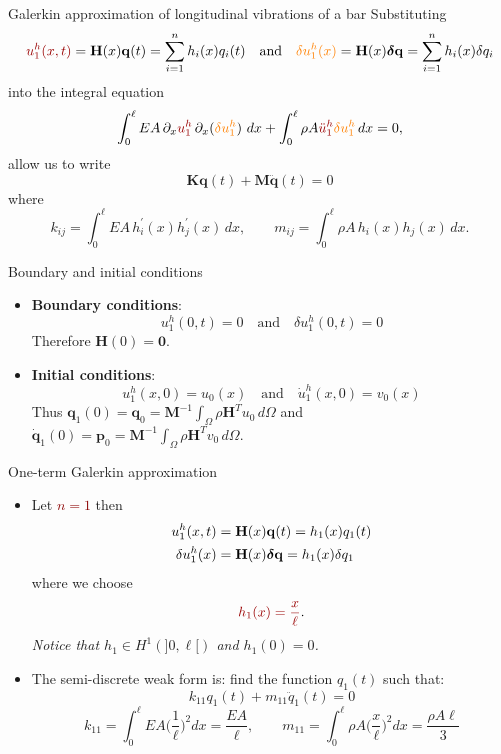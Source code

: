 \documentclass[aspectratio=169]{beamer}
\begin{document}
\begin{frame}{Galerkin approximation of longitudinal vibrations of a bar}
  Substituting
  $${\color{darkred} u_{1}^{h}(x,t)}=\mathbf H(x)\mathbf q(t)=\sum_{i=1}^nh_i(x)q_{i}(t)\quad\mbox{and}\quad {\color{orange}\delta u_{1}^{h}(x)}=\mathbf H(x)\bolddelta\mathbf q=\sum_{i=1}^nh_i(x)\delta q_{i}$$
  into the integral equation
  \[
    \int_0^\ell EA\, \partial_{x} {\color{darkred} u_1^h}\,\partial_{x}({\color{orange} \delta u_1^h})\ dx +\int_0^\ell\rho A {\color{darkred} \ddot{u}_1^h}{\color{orange} \delta u_1^h}\, dx=0,
  \]
  allow us to write
  \[
    \mathbf K\mathbf q(t)+\mathbf M\mathbf{\ddot q}(t)=0
  \]
  where
  \[
    k_{ij}  =\int_0^\ell EA\, h_i^\prime(x)h_j^\prime(x)\, dx, \qquad
    m_{ij}  =\int_0^\ell\rho A\, h_i(x)h_j(x)\, dx.
  \]
\end{frame}

\begin{frame}{Boundary and initial conditions}
  \begin{itemize}
    \item\textbf{Boundary conditions}:
          $$u_{1}^{h}(0,t)=0\quad\mbox{and}\quad \delta u_{1}^{h}(0,t)=0$$
          Therefore $\mathbf H(0)=\mathbf 0$.
          \vspace{0.5cm}\pause
    \item  \textbf{Initial conditions}:
          $$u_{1}^{h}(x,0)= u_{0}(x)\quad\mbox{and}\quad \dot u_{1}^{h}(x,0)= v_{0}(x)$$
          Thus $\mathbf q_{1}(0)=\mathbf q_{0}=\mathbf M^{-1}\int_\Omega \rho \mathbf H^T{u}_0\, d\Omega$ and $\mathbf{\dot q}_{1}(0)=\mathbf p_{0}=\mathbf M^{-1}\int_\Omega \rho \mathbf H^T{v}_0\, d\Omega$.
  \end{itemize}
\end{frame}

\begin{frame}{One-term Galerkin approximation}
  \begin{itemize}
    \item Let \textcolor{darkred}{$n=1$} then
          \begin{align*}
            u_{1}^{h}(x,t)      & =\mathbf H(x)\mathbf q(t)=h_{1}(x)q_{1}(t)            \\
            \delta u_{1}^{h}(x) & =\mathbf H(x)\boldsymbol\delta\mathbf q=h_{1}(x)\delta q_{1}
          \end{align*}
          where we choose
          $${\color{darkred} h_{1}(x)=\frac{x}{\ell}}.$$
          \emph{Notice that $h_{1}\in H^{1}(]0,\ell[)$ and $h_{1}(0)=0$.}
    \item The semi-discrete weak form is: find the function $q_{1}(t)$ such that:
          $$k_{11}q_{1}(t)+m_{11}\ddot q_{1}(t)=0$$
          $$k_{11}=\int_{0}^{\ell}EA \Big(\frac{1}{\ell}\Big)^{2}dx=\frac{EA}{\ell},\qquad m_{11}=\int_{0}^{\ell}\rho A \Big(\frac{x}{\ell}\Big)^{2}dx=\frac{\rho A\ell}{3}$$
  \end{itemize}
\end{frame}
\end{document}
